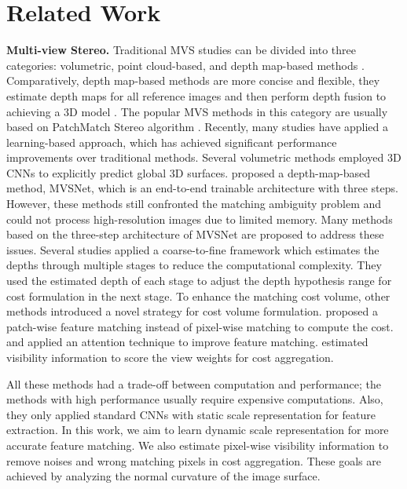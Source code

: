 \documentclass{article} \usepackage{iclr2022_conference,times}
\begin{document}
\section{Related Work}
\vspace{-0.25cm}
\textbf{Multi-view Stereo.} Traditional MVS studies can be divided into three categories: volumetric, point cloud-based, and depth map-based methods \citep{furukawa2015multi}. Comparatively, depth map-based methods are more concise and flexible, they estimate depth maps for all reference images and then perform depth fusion to achieving a 3D model \citep{galliani2015massively,schonberger2016pixelwise,xu2019multi}. The popular MVS methods in this category are usually based on PatchMatch Stereo algorithm \citep{barnes2009patchmatch}.  Recently, many studies have applied a learning-based approach, which has achieved significant performance improvements over traditional methods. Several volumetric methods \citep{kar2017learning,ji2017surfacenet} employed 3D CNNs to explicitly predict global 3D surfaces. \citet{yao2018mvsnet} proposed a depth-map-based method, MVSNet, which is an end-to-end trainable architecture with three steps. However, these methods still confronted the matching ambiguity problem and could not process high-resolution images due to limited memory. Many methods based on the three-step architecture of MVSNet are proposed to address these issues. Several studies \citep{gu2020cascade,cheng2020deep,yang2020cost,wang2021patchmatchnet,zhang2020visibility} applied a coarse-to-fine framework which estimates the depths through multiple stages to reduce the computational complexity. They used the estimated depth of each stage to adjust the depth hypothesis range for cost formulation in the next stage. 
To enhance the matching cost volume, other methods introduced a novel strategy for cost volume formulation. \citet{luo2019p} proposed a patch-wise feature matching instead of pixel-wise matching to compute the cost. \citet{yi2020pyramid} and \citet{luo2020attention} applied an attention technique to improve feature matching. \citet{zhang2020visibility,xu2020pvsnet} estimated visibility information to score the view weights for cost aggregation. 

All these methods \citep{gu2020cascade,cheng2020deep,yang2020cost,wang2021patchmatchnet,zhang2020visibility,luo2020attention,yu2020fast} had a trade-off between computation and performance; the methods with high performance usually require expensive computations. Also, they only applied standard CNNs with static scale representation for feature extraction. In this work, we aim to learn dynamic scale representation for more accurate feature matching. We also estimate pixel-wise visibility information to remove noises and wrong matching pixels in cost aggregation. These goals are achieved by analyzing the normal curvature of the image surface. 
\end{document}
